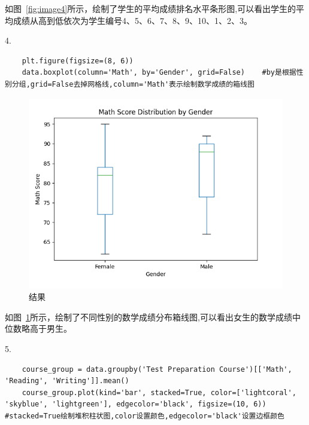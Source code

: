 \documentclass[12pt,a4paper,oneside]{article}
\begin{document}
如图~\ref{fig:image4}所示，绘制了学生的平均成绩排名水平条形图,可以看出学生的平均成绩从高到低依次为学生编号4、5、6、7、8、9、10、1、2、3。

4.\begin{lstlisting}
    plt.figure(figsize=(8, 6))
    data.boxplot(column='Math', by='Gender', grid=False)    #by是根据性别分组,grid=False去掉网格线,column='Math'表示绘制数学成绩的箱线图
\end{lstlisting}

\begin{figure}[H]
    \centering
    \begin{minipage}{0.4\textwidth}
        \centering
        \includegraphics[width=\textwidth]{image/Figure_3.png} %
        \caption{结果}
        \label{fig:image5}
    \end{minipage}
\end{figure}


如图~\ref{fig:image5}所示，绘制了不同性别的数学成绩分布箱线图,可以看出女生的数学成绩中位数略高于男生。


5.\begin{lstlisting}
    course_group = data.groupby('Test Preparation Course')[['Math', 'Reading', 'Writing']].mean()
    course_group.plot(kind='bar', stacked=True, color=['lightcoral', 'skyblue', 'lightgreen'], edgecolor='black', figsize=(10, 6))  #stacked=True绘制堆积柱状图,color设置颜色,edgecolor='black'设置边框颜色
\end{lstlisting}
\end{document}
